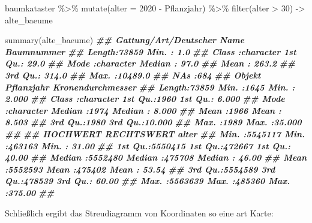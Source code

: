 \documentclass[
  ngerman,
]{article}
\newenvironment{Shaded}{\begin{snugshade}}{\end{snugshade}}
\newcommand{\AttributeTok}[1]{\textcolor[rgb]{0.77,0.63,0.00}{#1}}
\newcommand{\DecValTok}[1]{\textcolor[rgb]{0.00,0.00,0.81}{#1}}
\newcommand{\DocumentationTok}[1]{\textcolor[rgb]{0.56,0.35,0.01}{\textbf{\textit{#1}}}}
\newcommand{\FunctionTok}[1]{\textcolor[rgb]{0.00,0.00,0.00}{#1}}
\newcommand{\NormalTok}[1]{#1}
\newcommand{\OtherTok}[1]{\textcolor[rgb]{0.56,0.35,0.01}{#1}}
\newcommand{\SpecialCharTok}[1]{\textcolor[rgb]{0.00,0.00,0.00}{#1}}
\begin{document}
\begin{Shaded}
\begin{Highlighting}[]
\NormalTok{baumkataster }\SpecialCharTok{\%\textgreater{}\%}
  \FunctionTok{mutate}\NormalTok{(}\AttributeTok{alter =} \DecValTok{2020} \SpecialCharTok{{-}}\NormalTok{ Pflanzjahr) }\SpecialCharTok{\%\textgreater{}\%}
  \FunctionTok{filter}\NormalTok{(alter }\SpecialCharTok{\textgreater{}} \DecValTok{30}\NormalTok{) }\OtherTok{{-}\textgreater{}}
\NormalTok{  alte\_baeume}

\FunctionTok{summary}\NormalTok{(alte\_baeume)}
\DocumentationTok{\#\#  Gattung/Art/Deutscher Name   Baumnummer     }
\DocumentationTok{\#\#  Length:73859               Min.   :    1.0  }
\DocumentationTok{\#\#  Class :character           1st Qu.:   29.0  }
\DocumentationTok{\#\#  Mode  :character           Median :   97.0  }
\DocumentationTok{\#\#                             Mean   :  263.2  }
\DocumentationTok{\#\#                             3rd Qu.:  314.0  }
\DocumentationTok{\#\#                             Max.   :10489.0  }
\DocumentationTok{\#\#                             NA\textquotesingle{}s   :684      }
\DocumentationTok{\#\#     Objekt            Pflanzjahr   Kronendurchmesser}
\DocumentationTok{\#\#  Length:73859       Min.   :1645   Min.   : 2.000   }
\DocumentationTok{\#\#  Class :character   1st Qu.:1960   1st Qu.: 6.000   }
\DocumentationTok{\#\#  Mode  :character   Median :1974   Median : 8.000   }
\DocumentationTok{\#\#                     Mean   :1966   Mean   : 8.503   }
\DocumentationTok{\#\#                     3rd Qu.:1980   3rd Qu.:10.000   }
\DocumentationTok{\#\#                     Max.   :1989   Max.   :35.000   }
\DocumentationTok{\#\#                                                     }
\DocumentationTok{\#\#     HOCHWERT         RECHTSWERT         alter       }
\DocumentationTok{\#\#  Min.   :5545117   Min.   :463163   Min.   : 31.00  }
\DocumentationTok{\#\#  1st Qu.:5550415   1st Qu.:472667   1st Qu.: 40.00  }
\DocumentationTok{\#\#  Median :5552480   Median :475708   Median : 46.00  }
\DocumentationTok{\#\#  Mean   :5552593   Mean   :475402   Mean   : 53.54  }
\DocumentationTok{\#\#  3rd Qu.:5554589   3rd Qu.:478539   3rd Qu.: 60.00  }
\DocumentationTok{\#\#  Max.   :5563639   Max.   :485360   Max.   :375.00  }
\DocumentationTok{\#\# }
\end{Highlighting}
\end{Shaded}

Schließlich ergibt das Streudiagramm von Koordinaten so eine art Karte:
\end{document}
